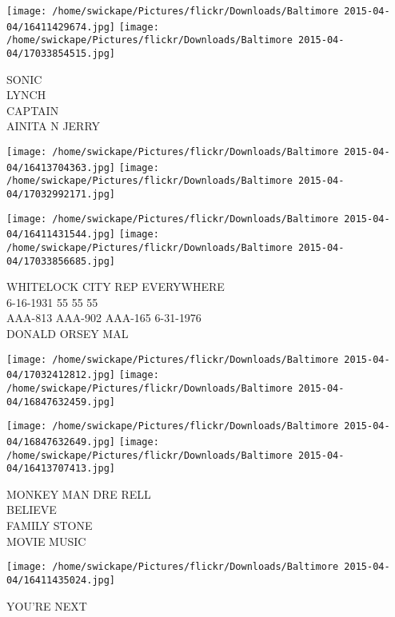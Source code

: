 \documentclass[10pt,letterpaper]{article}
\begin{document}
\texttt{[image: /home/swickape/Pictures/flickr/Downloads/Baltimore 2015-04-04/16411429674.jpg]}
\texttt{[image: /home/swickape/Pictures/flickr/Downloads/Baltimore 2015-04-04/17033854515.jpg]}

SONIC\\
LYNCH\\
CAPTAIN\\
AINITA N JERRY\\
\pagebreak

\texttt{[image: /home/swickape/Pictures/flickr/Downloads/Baltimore 2015-04-04/16413704363.jpg]}
\texttt{[image: /home/swickape/Pictures/flickr/Downloads/Baltimore 2015-04-04/17032992171.jpg]}

\texttt{[image: /home/swickape/Pictures/flickr/Downloads/Baltimore 2015-04-04/16411431544.jpg]}
\texttt{[image: /home/swickape/Pictures/flickr/Downloads/Baltimore 2015-04-04/17033856685.jpg]}

WHITELOCK CITY REP EVERYWHERE\\
6{-}16{-}1931 55 55 55\\
AAA{-}813 AAA{-}902 AAA{-}165 6{-}31{-}1976\\
DONALD ORSEY MAL\\
\pagebreak

\texttt{[image: /home/swickape/Pictures/flickr/Downloads/Baltimore 2015-04-04/17032412812.jpg]}
\texttt{[image: /home/swickape/Pictures/flickr/Downloads/Baltimore 2015-04-04/16847632459.jpg]}

\texttt{[image: /home/swickape/Pictures/flickr/Downloads/Baltimore 2015-04-04/16847632649.jpg]}
\texttt{[image: /home/swickape/Pictures/flickr/Downloads/Baltimore 2015-04-04/16413707413.jpg]}

MONKEY MAN DRE RELL\\
BELIEVE\\
FAMILY STONE\\
MOVIE MUSIC\\
\pagebreak

\texttt{[image: /home/swickape/Pictures/flickr/Downloads/Baltimore 2015-04-04/16411435024.jpg]}

YOU'RE NEXT\\
\pagebreak
\end{document}
